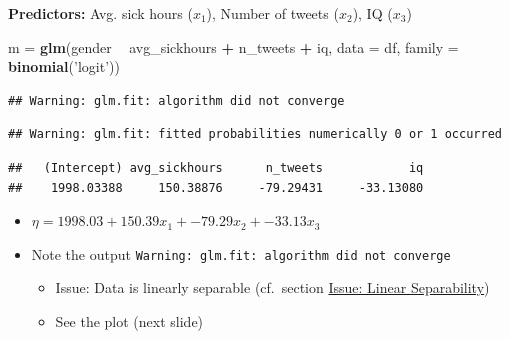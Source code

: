 \documentclass[
  ignorenonframetext,
]{beamer}
\newenvironment{Shaded}{\begin{snugshade}}{\end{snugshade}}
\newcommand{\DataTypeTok}[1]{\textcolor[rgb]{0.13,0.29,0.53}{#1}}
\newcommand{\KeywordTok}[1]{\textcolor[rgb]{0.13,0.29,0.53}{\textbf{#1}}}
\newcommand{\NormalTok}[1]{#1}
\newcommand{\OperatorTok}[1]{\textcolor[rgb]{0.81,0.36,0.00}{\textbf{#1}}}
\newcommand{\StringTok}[1]{\textcolor[rgb]{0.31,0.60,0.02}{#1}}
\providecommand{\tightlist}{%
  \setlength{\itemsep}{0pt}\setlength{\parskip}{0pt}}
\begin{document}
\begin{frame}[fragile]

\textbf{Predictors:} Avg. sick hours (\(x_1\)), Number of tweets
(\(x_2\)), IQ (\(x_3\))

\tiny

\begin{Shaded}
\begin{Highlighting}[]
\NormalTok{m =}\StringTok{ }\KeywordTok{glm}\NormalTok{(gender }\OperatorTok{~}\StringTok{ }\NormalTok{avg_sickhours }\OperatorTok{+}\StringTok{ }\NormalTok{n_tweets }\OperatorTok{+}\StringTok{ }\NormalTok{iq, }\DataTypeTok{data =}\NormalTok{ df, }\DataTypeTok{family =} \KeywordTok{binomial}\NormalTok{(}\StringTok{'logit'}\NormalTok{))}
\end{Highlighting}
\end{Shaded}

\begin{verbatim}
## Warning: glm.fit: algorithm did not converge
\end{verbatim}

\begin{verbatim}
## Warning: glm.fit: fitted probabilities numerically 0 or 1 occurred
\end{verbatim}

\begin{Shaded}
\end{Shaded}

\begin{verbatim}
##   (Intercept) avg_sickhours      n_tweets            iq 
##    1998.03388     150.38876     -79.29431     -33.13080
\end{verbatim}

\normalsize
\tiny\normalsize

\begin{itemize}
\item
  \(\eta= 1998.03 + 150.39 x_1 + -79.29 x_2 + -33.13 x_3\)
\item
  Note the output
  \texttt{Warning:\ glm.fit:\ algorithm\ did\ not\ converge}

  \begin{itemize}
  \tightlist
  \item
    Issue: Data is linearly separable (cf.~section
    \protect\hyperlink{issue-linear-separability}{Issue: Linear
    Separability})
  \item
    See the plot (next slide)
  \end{itemize}
\end{itemize}

\end{frame}
\end{document}

